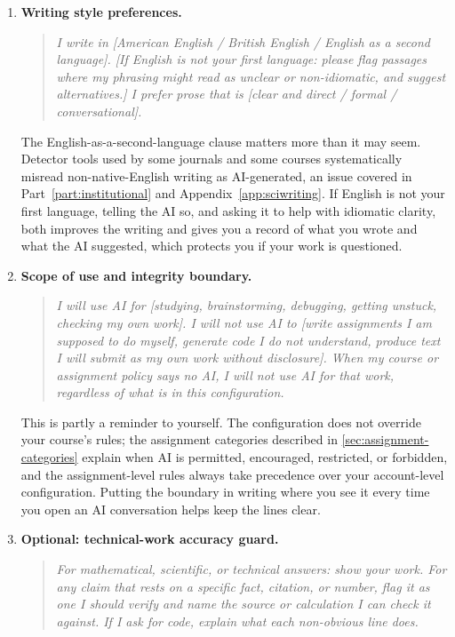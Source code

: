 \documentclass{SIAMbook2023}
\begin{document}
\begin{enumerate}
\item \textbf{Writing style preferences.}

\begin{quote}
\textit{I write in [American English / British English / English as a second language]. [If English is not your first language: please flag passages where my phrasing might read as unclear or non-idiomatic, and suggest alternatives.] I prefer prose that is [clear and direct / formal / conversational].}
\end{quote}

The English-as-a-second-language clause matters more than it may seem. Detector tools used by some journals and some courses systematically misread non-native-English writing as AI-generated, an issue covered in Part~\ref{part:institutional} and Appendix~\ref{app:sciwriting}. If English is not your first language, telling the AI so, and asking it to help with idiomatic clarity, both improves the writing and gives you a record of what you wrote and what the AI suggested, which protects you if your work is questioned.

\item \textbf{Scope of use and integrity boundary.}

\begin{quote}
\textit{I will use AI for [studying, brainstorming, debugging, getting unstuck, checking my own work]. I will not use AI to [write assignments I am supposed to do myself, generate code I do not understand, produce text I will submit as my own work without disclosure]. When my course or assignment policy says no AI, I will not use AI for that work, regardless of what is in this configuration.}
\end{quote}

This is partly a reminder to yourself. The configuration does not override your course's rules; the assignment categories described in \cref{sec:assignment-categories} explain when AI is permitted, encouraged, restricted, or forbidden, and the assignment-level rules always take precedence over your account-level configuration. Putting the boundary in writing where you see it every time you open an AI conversation helps keep the lines clear.

\item \textbf{Optional: technical-work accuracy guard.}

\begin{quote}
\textit{For mathematical, scientific, or technical answers: show your work. For any claim that rests on a specific fact, citation, or number, flag it as one I should verify and name the source or calculation I can check it against. If I ask for code, explain what each non-obvious line does.}
\end{quote}


\end{enumerate}
\end{document}
